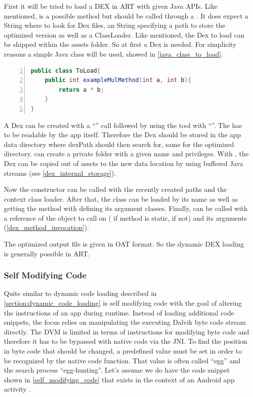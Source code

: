 First it will be tried to load a DEX in ART with given Java APIs.
Like mentioned,  is a possible method but should be called
through a . It does expect a  String where to look for Dex files, an  String specifying a path to store the optimized version as well as a  ClassLoader.
Like mentioned, the Dex to load can be shipped within the assets folder.
So at first a Dex is needed. For simplicity reasons a simple Java class will be used, showed in \autoref{java_class_to_load}.
\begin{lstlisting}[language=Java, caption=Java Class to load, label=java_class_to_load, numbers=left]
public class ToLoad{
    public int exampleMulMethod(int a, int b){
        return a * b;
    }
}
\end{lstlisting}
A Dex can be created with a ``'' call followed by
using the  tool with ``''. The  has to be readable by the app itself. Therefore
the Dex should be stored in the app data directory where dexPath should then
search for, same for the optimized directory.
 can create a private folder with a given name
and privileges. With , the Dex can be
copied out of assets to the new data location by using buffered Java streams (see \autoref{dex_internal_storage}).

Now the  constructor can be called with the recently
created paths and the context class loader. After that, the class can be loaded
by its name as well as getting the method with defining its argument classes.
Finally,  can be called with a reference of the object to call
on ( if method is static,  if not) and its
arguments (\autoref{dex_method_invocation}).

The optimized output file is given in OAT format.
So the dynamic DEX loading is generally possible in ART.

\subsubsection{Self Modifying Code}
Quite similar to dynamic code loading described in
\autoref{section:dynamic_code_loading} is self modifying code with the goal
of altering the instructions of an app during runtime.
Instead of loading additional code snippets, the focus relies on
manipulating the executing Dalvik byte code stream directly.
The DVM is limited in terms of instructions for modifying byte code
and therefore it has to be bypassed with native code via the JNI.
To find the position in byte code that should be changed, a predefined
value must be set in order to be recognized by the native code function.
That value is often called ``egg'' and the search process ``egg-hunting''.
Let's assume we do have the code snippet shown in \autoref{self_modifying_code} that exists in the context of an Android app activity
\parencite{code_protection}.

